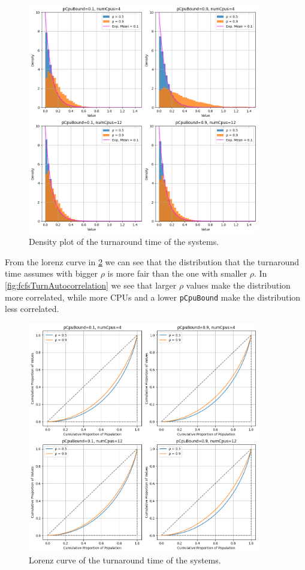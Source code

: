\begin{figure}[H]
    \captionsetup{type=figure}
    \centering
    \includegraphics[width=0.9\textwidth]{./images/04/fcfs/turn/density.png}
    \caption{Density plot of the turnaround time of the systems.}
    \label{fig:fcfsTurnDensity}
\end{figure}

From the lorenz curve in \cref{fig:fcfsTurnLorenz} we can see that the distribution that the turnaround time assumes with bigger $\rho$ is more fair than the one with smaller $\rho$. In \cref{fig:fcfsTurnAutocorrelation} we see that larger $\rho$ values make the distribution more correlated, while more CPUs and a lower \texttt{pCpuBound} make the distribution less correlated.

\begin{figure}[H]
    \captionsetup{type=figure}
    \centering
    \includegraphics[width=0.9\textwidth]{./images/04/fcfs/turn/lorenz.png}
    \caption{Lorenz curve of the turnaround time of the systems.}
    \label{fig:fcfsTurnLorenz}
\end{figure}

